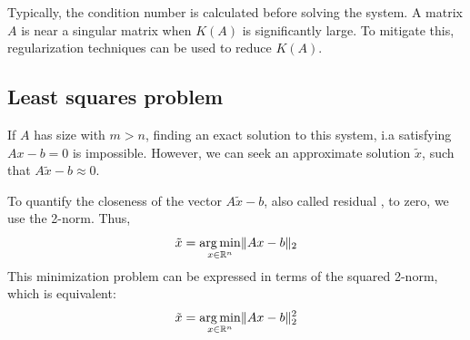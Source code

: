 \documentclass{article}
\begin{document}
Typically, the condition number is calculated before solving the system. A
matrix $A$ is near a singular matrix when $K(A)$ is significantly large. To
mitigate this, regularization techniques can be used to reduce $K(A)$.
\subsection{Least squares problem}
If $A$ has size with $m>n$, finding an exact solution to this system, i.a
satisfying $Ax-b=0$ is impossible. However, we can seek an approximate
solution $\tilde{x}$, such that $A\tilde{x}-b\approx0$.

To quantify the closeness of the vector $A\tilde{x}-b$, also called residual
, to zero, we use the 2-norm. Thus,
$$\tilde{x}=\operatorname*{arg\,min}_{x\in \mathbb{R}^n}\lVert Ax-b\rVert_2$$
This minimization problem can be expressed in terms of the squared 2-norm,
which is equivalent:
$$\tilde{x}=\operatorname*{arg\,min}_{x\in \mathbb{R}^n}\lVert Ax-b\rVert_2^2$$
\end{document}

